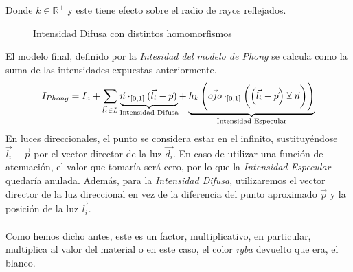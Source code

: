 Donde \(k\in\mathbb{R}^{+}\) y este tiene efecto sobre el radio de rayos reflejados.
\begin{figure}[H]
  \centering
  \captionsetup{justification=centering}%
  \caption{Intensidad Difusa con distintos homomorfismos}
\end{figure}
El modelo final, definido por la \textit{Intesidad del modelo de Phong} se calcula como la suma de las intensidades expuestas anteriormente.
\[I_{Phong}=I_a+\sum_{\Vec{l_i}\in L} \mathrlap{\underbrace{\phantom{\Vec{n}\cdot_{[0, 1]}(\Vec{l_i}-\Vec{p})}}_{\text{Intensidad Difusa}}}\Vec{n}\cdot_{[0, 1]}(\Vec{l_i}-\Vec{p}) + \mathrlap{\underbrace{\phantom{h_k\left(\Vec{ojo}\cdot_{[0, 1]}\left(\left(\Vec{l_i}-\Vec{p}\right) \veebar \Vec{n}\right)\right)}}_{\text{Intensidad Especular}}}h_k\left(\Vec{ojo}\cdot_{[0, 1]}\left(\left(\Vec{l_i}-\Vec{p}\right) \veebar \Vec{n}\right)\right)\]
En luces direccionales, el punto se considera estar en el infinito, sustituyéndose \(\Vec{l_i}-\Vec{p}\) por el vector director de la luz \(\Vec{d_i}\). En caso de utilizar una función de atenuación, el valor que tomaría  será cero, por lo que la \textit{Intensidad Especular} quedaría anulada. Además, para la \textit{Intensidad Difusa}, utilizaremos el vector director de la luz direccional en vez de la diferencia del punto aproximado \(\Vec{p}\) y la posición de la luz \(\Vec{l_i}\).\\\\
Como hemos dicho antes, este es un factor, multiplicativo, en particular, multiplica al valor del material o en este caso, el color \textit{rgba} devuelto que era, el blanco.\\\\
